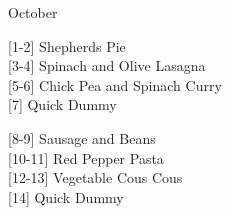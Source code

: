 		\begin{menu}{October}
    
    \begin{recipelist}
    
        {\scriptsize[1-2]} Shepherds Pie\\
        {\scriptsize[3-4]} Spinach and Olive Lasagna\\
        {\scriptsize[5-6]} Chick Pea and Spinach Curry\\
        {\scriptsize[7]} Quick Dummy\\%
    \end{recipelist}%
    \begin{recipelist}
    
        {\scriptsize[8-9]} Sausage and Beans\\
        {\scriptsize[10-11]} Red Pepper Pasta\\
        {\scriptsize[12-13]} Vegetable Cous Cous\\
        {\scriptsize[14]} Quick Dummy\\%
    \end{recipelist}\par%
  

\end{menu}
